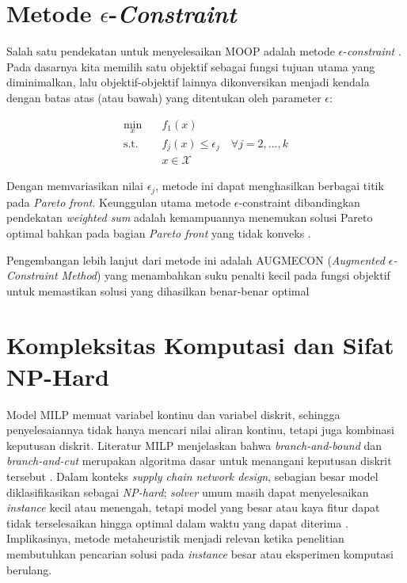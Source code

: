 \documentclass{file/TA-ITS}
\theoremstyle{definition}
\theoremstyle{definition}
\theoremstyle{plain}
\begin{document}
\section{Metode $\epsilon$-\textit{Constraint}}

Salah satu pendekatan untuk menyelesaikan MOOP adalah metode $\epsilon$-\textit{constraint} \cite{MAVROTAS_EPSILON}. Pada dasarnya kita memilih satu objektif sebagai fungsi tujuan utama yang diminimalkan, lalu objektif-objektif lainnya dikonversikan menjadi kendala dengan batas atas (atau bawah) yang ditentukan oleh parameter $\epsilon$:

\begin{align}
\label{eq:epsilon_constraint_general}
\min_x \quad & f_1(x) \\
\text{s.t.} \quad & f_j(x) \leq \epsilon_j \quad \forall j = 2, \ldots, k \\
& x \in \mathcal{X}
\end{align}

Dengan memvariasikan nilai $\epsilon_j$, metode ini dapat menghasilkan berbagai titik pada \textit{Pareto front}. Keunggulan utama metode $\epsilon$-constraint dibandingkan pendekatan \textit{weighted sum} adalah kemampuannya menemukan solusi Pareto optimal bahkan pada bagian \textit{Pareto front} yang tidak konveks \cite{MAVROTAS_EPSILON}.

Pengembangan lebih lanjut dari metode ini adalah AUGMECON (\textit{Augmented $\epsilon$-Constraint Method}) yang menambahkan suku penalti kecil pada fungsi objektif untuk memastikan solusi yang dihasilkan benar-benar optimal \cite{MAVROTAS_EPSILON}


\section{Kompleksitas Komputasi dan Sifat NP-Hard}
Model MILP memuat variabel kontinu dan variabel diskrit, sehingga penyelesaiannya tidak hanya mencari nilai aliran kontinu, tetapi juga kombinasi keputusan diskrit. Literatur MILP menjelaskan bahwa \textit{branch-and-bound} dan \textit{branch-and-cut} merupakan algoritma dasar untuk menangani keputusan diskrit tersebut \cite{ntnu_milp}. Dalam konteks \textit{supply chain network design}, sebagian besar model diklasifikasikan sebagai \textit{NP-hard}; \textit{solver} umum masih dapat menyelesaikan \textit{instance} kecil atau menengah, tetapi model yang besar atau kaya fitur dapat tidak terselesaikan hingga optimal dalam waktu yang dapat diterima \cite{ESKANDARPOUR2017lns_supply}. Implikasinya, metode metaheuristik menjadi relevan ketika penelitian membutuhkan pencarian solusi pada \textit{instance} besar atau eksperimen komputasi berulang.
\end{document}
